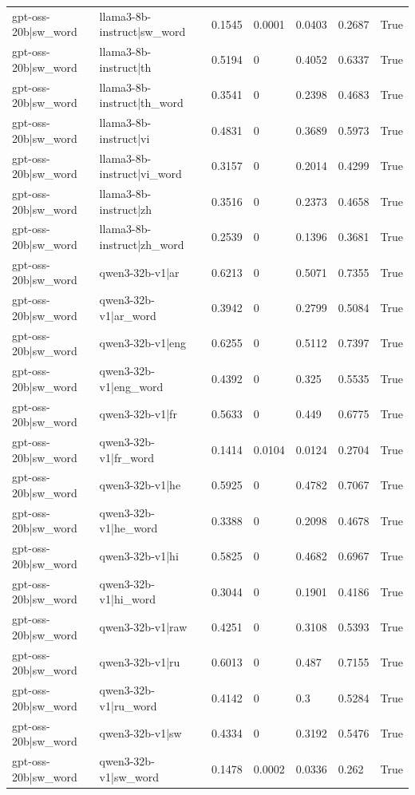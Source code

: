 \begin{table}
\begin{tabular}{llllllr}
gpt-oss-20b|sw_word & llama3-8b-instruct|sw_word & 0.1545 & 0.0001 & 0.0403 & 0.2687 & True \\
gpt-oss-20b|sw_word & llama3-8b-instruct|th & 0.5194 & 0 & 0.4052 & 0.6337 & True \\
gpt-oss-20b|sw_word & llama3-8b-instruct|th_word & 0.3541 & 0 & 0.2398 & 0.4683 & True \\
gpt-oss-20b|sw_word & llama3-8b-instruct|vi & 0.4831 & 0 & 0.3689 & 0.5973 & True \\
gpt-oss-20b|sw_word & llama3-8b-instruct|vi_word & 0.3157 & 0 & 0.2014 & 0.4299 & True \\
gpt-oss-20b|sw_word & llama3-8b-instruct|zh & 0.3516 & 0 & 0.2373 & 0.4658 & True \\
gpt-oss-20b|sw_word & llama3-8b-instruct|zh_word & 0.2539 & 0 & 0.1396 & 0.3681 & True \\
gpt-oss-20b|sw_word & qwen3-32b-v1|ar & 0.6213 & 0 & 0.5071 & 0.7355 & True \\
gpt-oss-20b|sw_word & qwen3-32b-v1|ar_word & 0.3942 & 0 & 0.2799 & 0.5084 & True \\
gpt-oss-20b|sw_word & qwen3-32b-v1|eng & 0.6255 & 0 & 0.5112 & 0.7397 & True \\
gpt-oss-20b|sw_word & qwen3-32b-v1|eng_word & 0.4392 & 0 & 0.325 & 0.5535 & True \\
gpt-oss-20b|sw_word & qwen3-32b-v1|fr & 0.5633 & 0 & 0.449 & 0.6775 & True \\
gpt-oss-20b|sw_word & qwen3-32b-v1|fr_word & 0.1414 & 0.0104 & 0.0124 & 0.2704 & True \\
gpt-oss-20b|sw_word & qwen3-32b-v1|he & 0.5925 & 0 & 0.4782 & 0.7067 & True \\
gpt-oss-20b|sw_word & qwen3-32b-v1|he_word & 0.3388 & 0 & 0.2098 & 0.4678 & True \\
gpt-oss-20b|sw_word & qwen3-32b-v1|hi & 0.5825 & 0 & 0.4682 & 0.6967 & True \\
gpt-oss-20b|sw_word & qwen3-32b-v1|hi_word & 0.3044 & 0 & 0.1901 & 0.4186 & True \\
gpt-oss-20b|sw_word & qwen3-32b-v1|raw & 0.4251 & 0 & 0.3108 & 0.5393 & True \\
gpt-oss-20b|sw_word & qwen3-32b-v1|ru & 0.6013 & 0 & 0.487 & 0.7155 & True \\
gpt-oss-20b|sw_word & qwen3-32b-v1|ru_word & 0.4142 & 0 & 0.3 & 0.5284 & True \\
gpt-oss-20b|sw_word & qwen3-32b-v1|sw & 0.4334 & 0 & 0.3192 & 0.5476 & True \\
gpt-oss-20b|sw_word & qwen3-32b-v1|sw_word & 0.1478 & 0.0002 & 0.0336 & 0.262 & True \\

\end{tabular}
\end{table}
